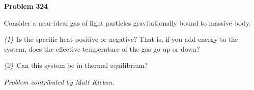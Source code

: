 \documentclass[12pt]{article}
\begin{document}
\begin{pottproblem}
\textbf{Problem 324}

Consider a near-ideal gas of light particles gravitationally bound to massive body.

\textsl{(1)}~Is the specific heat positive or negative?
That is, if you add energy to the system, does the effective temperature of the gas go up or down?

\textsl{(2)}~Can this system be in thermal equilibrium?

\textsl{Problem contributed by Matt Kleban.}

\end{pottproblem}
\end{document}
